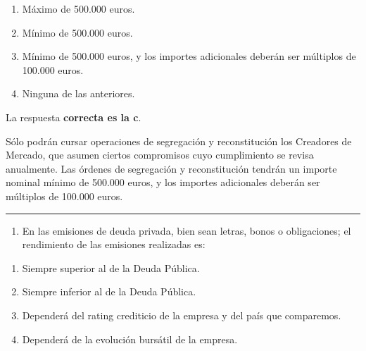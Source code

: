 \documentclass[
  letterpaper,
  DIV=11,
  numbers=noendperiod]{scrreprt}
\providecommand{\tightlist}{%
  \setlength{\itemsep}{0pt}\setlength{\parskip}{0pt}}\usepackage{longtable,booktabs,array}
\begin{document}
\begin{enumerate}
\def\labelenumi{\alph{enumi})}
\item
  Máximo de 500.000 euros.
\item
  Mínimo de 500.000 euros.
\item
  Mínimo de 500.000 euros, y los importes adicionales deberán ser
  múltiplos de 100.000 euros.
\item
  Ninguna de las anteriores.
\end{enumerate}

\begin{tcolorbox}[enhanced jigsaw, left=2mm, opacityback=0, colback=white, breakable, arc=.35mm, bottomrule=.15mm, rightrule=.15mm, toprule=.15mm, leftrule=.75mm, colframe=quarto-callout-tip-color-frame]
\begin{minipage}[t]{5.5mm}
\textcolor{quarto-callout-tip-color}{\faLightbulb}
\end{minipage}%
\begin{minipage}[t]{\textwidth - 5.5mm}

La respuesta \textbf{correcta es la c}.

Sólo podrán cursar operaciones de segregación y reconstitución los
Creadores de Mercado, que asumen ciertos compromisos cuyo cumplimiento
se revisa anualmente. Las órdenes de segregación y reconstitución
tendrán un importe nominal mínimo de 500.000 euros, y los importes
adicionales deberán ser múltiplos de 100.000 euros.

\end{minipage}%
\end{tcolorbox}

\begin{center}\rule{0.5\linewidth}{0.5pt}\end{center}

\begin{enumerate}
\def\labelenumi{\arabic{enumi}.}
\setcounter{enumi}{67}
\tightlist
\item
  En las emisiones de deuda privada, bien sean letras, bonos o
  obligaciones; el rendimiento de las emisiones realizadas es:
\end{enumerate}

\begin{enumerate}
\def\labelenumi{\alph{enumi})}
\item
  Siempre superior al de la Deuda Pública.
\item
  Siempre inferior al de la Deuda Pública.
\item
  Dependerá del rating crediticio de la empresa y del país que
  comparemos.
\item
  Dependerá de la evolución bursátil de la empresa.
\end{enumerate}
\end{document}
